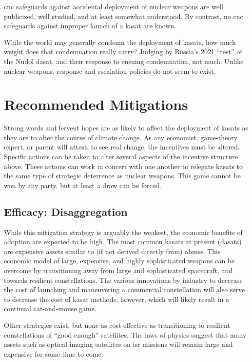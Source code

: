 \ac{cnc} safeguards against accidental deployment of nuclear weapons
are well publicized, well studied, and at least somewhat understood.
By contrast, no \ac{cnc} safeguards against improper launch of a
\ac{kasat} are known.

While the world may generally condemn the deployment of \acp{kasat},
how much weight does that condemnation really carry?  Judging by
Russia's 2021 ``test'' of the Nudol \ac{dasat}, and their response to
ensuing condemnation, not much.  Unlike nuclear weapons, response and
escalation policies do not seem to exist.


\section*{Recommended Mitigations}

Strong words and fervent hopes are as likely to affect the deployment
of \acp{kasat} as they are to alter the course of climate change.  As
any economist, game-theory expert, or parent will attest: to see real
change, the incentives must be altered.  Specific actions can be taken
to alter several aspects of the incentive structure above.  These
actions can work in concert with one another to relegate \acp{kasat}
to the same type of strategic deterrence as nuclear weapons.  This
game cannot be won by any party, but at least a draw can be forced.


\subsection*{Efficacy: Disaggregation}
While this mitigation strategy is arguably the weakest, the economic
benefits of adoption are expected to be high.  The most common
\acp{kasat} at present (\acp{dasat}) are expensive assets similar to
(if not derived directly from) \acp{abms}.  This economic model of
large, expensive, and highly sophisticated weapons can be overcome by
transitioning away from large and sophisticated spacecraft, and
towards resilient constellations.  The various innovations by industry
to decrease the cost of launching and maneuvering a commercial
constellation will also serve to decrease the cost of \ac{kasat}
methods, however, which will likely result in a continual
cat-and-mouse game.

Other strategies exist, but none as cost effective as transitioning to
resilient constellations of ``good enough'' satellites.  The laws of
physics suggest that many assets such as optical imaging satellites on
\ac{isr} missions will remain large and expensive for some time to
come.

